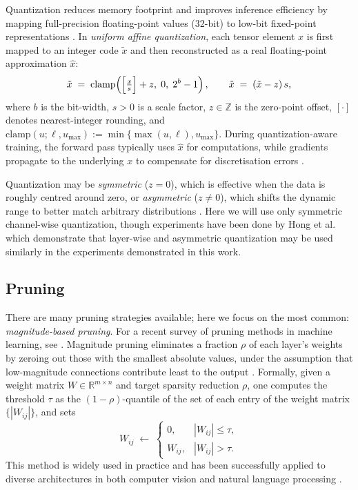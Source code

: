 \documentclass{article}
\theoremstyle{plain}
\theoremstyle{definition}
\theoremstyle{remark}
\begin{document}
Quantization reduces memory footprint and improves inference efficiency by mapping full-precision floating-point values (32-bit) to low-bit fixed-point representations \cite{jacob_quantization_2017,wang_outliertune_2024}. In \emph{uniform affine quantization}, each tensor element \(x\) is first mapped to an integer code \(\tilde{x}\) and then reconstructed as a real floating-point approximation \(\hat{x}\):  
\begin{equation}\label{eq:quant}
\tilde{x} \;=\;\mathrm{clamp}\!\left(\Bigl[\tfrac{x}{s}\Bigr] + z,\;0,\;2^b-1\right), 
\qquad
\hat{x} \;=\;( \tilde{x} - z)\,s,
\end{equation}
where \(b\) is the bit-width, \(s>0\) is a scale factor, \(z\in\mathbb{Z}\) is the zero-point offset, \([\cdot]\) denotes nearest-integer rounding, and \(\mathrm{clamp}(u;\ell,u_{\max}):=\min\{\max(u,\ell),u_{\max}\}\). During quantization-aware training, the forward pass typically uses \(\hat{x}\) for computations, while gradients propagate to the underlying \(x\) to compensate for discretisation errors \cite{jacob_quantization_2017}.

Quantization may be \emph{symmetric} (\(z=0\)), which is effective when the data is roughly centred around zero, or \emph{asymmetric} (\(z\neq0\)), which shifts the dynamic range to better match arbitrary distributions \cite{gysel_hardware-oriented_2016}.  Here we will use only symmetric channel-wise quantization, though experiments have been done by Hong et al. \cite{hong_qu-anti-zation_2021} which demonstrate that layer-wise and asymmetric quantization may be used similarly in the experiments demonstrated in this work.


\subsection{Pruning}\label{prune}
There are many pruning strategies available; here we focus on the most common: \emph{magnitude-based pruning}. 
For a recent survey of pruning methods in machine learning, see \cite{vadera_methods_2021}. 
Magnitude pruning eliminates a fraction \(\rho\) of each layer’s weights by zeroing out those with the smallest absolute values, under the assumption that low-magnitude connections contribute least to the output \cite{han_learning_2015}. Formally, given a weight matrix \(W \in \mathbb{R}^{m\times n}\) and target sparsity reduction \(\rho\), one computes the threshold \(\tau\) as the \((1-\rho)\)-quantile of the set of each entry of the weight matrix \(\{|W_{ij}|\}\), and  sets
\[
W_{ij} \;\leftarrow\;
\begin{cases}
0, & |W_{ij}| \le \tau,\\
W_{ij}, & |W_{ij}| > \tau.
\end{cases}
\]
This method is widely used in practice and has been successfully applied to diverse architectures in both computer vision \cite{guo_dynamic_2016} and natural language processing \cite{gale_state_2019}.
\end{document}
